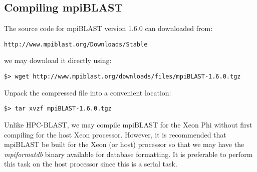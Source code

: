 \documentclass[10pt]{article}
\begin{document}
\subsection{Compiling mpiBLAST} \label{sec:mpicomp}

The source code for mpiBLAST version 1.6.0 can downloaded from:
\begin{verbatim}
http://www.mpiblast.org/Downloads/Stable
\end{verbatim}
\noindent we may download it directly using:
\begin{verbatim}
$> wget http://www.mpiblast.org/downloads/files/mpiBLAST-1.6.0.tgz
\end{verbatim}
\noindent Unpack the compressed file into a convenient location:
\begin{verbatim}
$> tar xvzf mpiBLAST-1.6.0.tgz
\end{verbatim}

 Unlike HPC-BLAST, we may compile mpiBLAST for the Xeon Phi without first compiling for the host Xeon processor.  However, it is recommended that mpiBLAST be built for the Xeon (or host) processor so that we may
have the \emph{mpiformatdb} binary available for database formatting.  It is preferable to perform this task on the host processor since this is a serial task.
\end{document}
